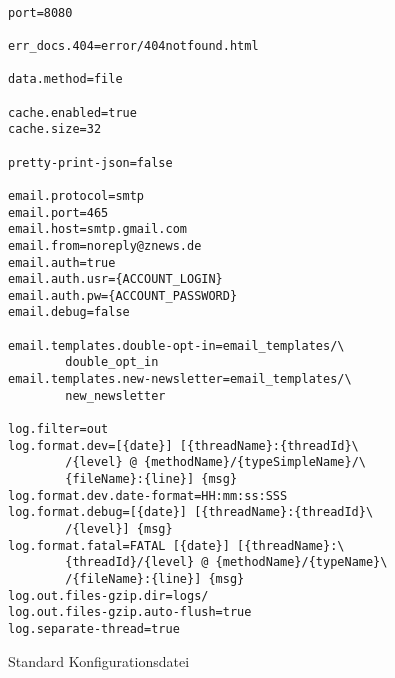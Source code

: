 \begin{figure}[p]
    \centering
    \begin{lstlisting}[frame=single,language=incomplete-Ini]%formatter:off

port=8080

err_docs.404=error/404notfound.html

data.method=file

cache.enabled=true
cache.size=32

pretty-print-json=false

email.protocol=smtp
email.port=465
email.host=smtp.gmail.com
email.from=noreply@znews.de
email.auth=true
email.auth.usr={ACCOUNT_LOGIN}
email.auth.pw={ACCOUNT_PASSWORD}
email.debug=false

email.templates.double-opt-in=email_templates/\
        double_opt_in
email.templates.new-newsletter=email_templates/\
        new_newsletter

log.filter=out
log.format.dev=[{date}] [{threadName}:{threadId}\
        /{level} @ {methodName}/{typeSimpleName}/\
        {fileName}:{line}] {msg}
log.format.dev.date-format=HH:mm:ss:SSS
log.format.debug=[{date}] [{threadName}:{threadId}\
        /{level}] {msg}
log.format.fatal=FATAL [{date}] [{threadName}:\
        {threadId}/{level} @ {methodName}/{typeName}\
        /{fileName}:{line}] {msg}
log.out.files-gzip.dir=logs/
log.out.files-gzip.auto-flush=true
log.separate-thread=true
    \end{lstlisting}%
    \caption{\label{fig:config-std}Standard Konfigurationsdatei}
\end{figure}


%


\End
